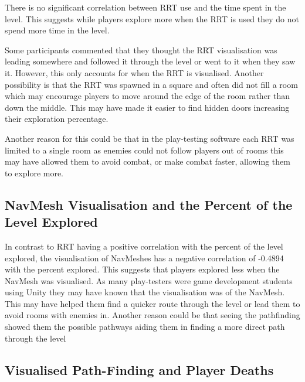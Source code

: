 \documentclass[journal]{IEEEtran}
\begin{document}
	There is no significant correlation between RRT use and the time spent in the level. This suggests while players explore more when the RRT is used they do not spend more time in the level.  
	
	Some participants commented that they thought the RRT visualisation was leading somewhere and followed it through the level or went to it when they saw it.  However, this only accounts for when the RRT is visualised. Another possibility is that the RRT was spawned in a square and often did not fill a room which may encourage players to move around the edge of the room rather than down the middle. This may have made it easier to find hidden doors increasing their exploration percentage.
	
	Another reason for this could be that in the play-testing software each RRT was limited to a single room as enemies could not follow players out of rooms this may have allowed them to avoid combat, or make combat faster, allowing them to explore more. 
	
	
	\subsection{NavMesh Visualisation and the Percent of the Level Explored}
	
	In contrast to RRT having a positive correlation with the percent of the level explored, the visualisation of NavMeshes has a negative correlation of -0.4894 with the percent explored. This suggests that players explored less when the NavMesh was visualised.  As many play-testers were game development students using Unity they may have known that the visualisation was of the NavMesh. This may have helped them find a quicker route through the level or lead them to avoid rooms with enemies in. Another reason could be that seeing the pathfinding showed them the possible pathways aiding them in finding a more direct path through the level
	
	\subsection{Visualised Path-Finding and Player Deaths}
	
\end{document}
